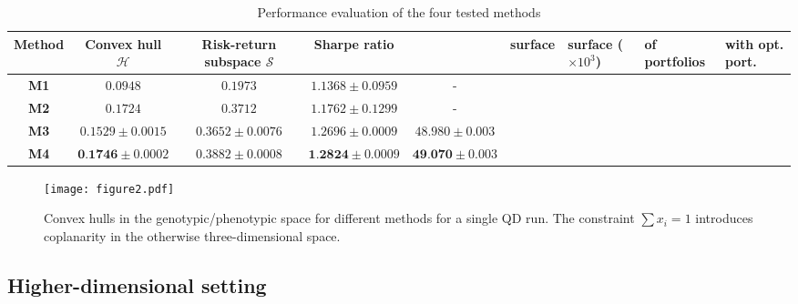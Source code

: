\begin{table}[ht!]
\centering
\caption{Performance evaluation of the four tested methods}
\begin{tabular}{|c|c|c|c|c|}
\hline
Method & Convex hull $\mathcal{H}$& Risk-return subspace $\mathcal{S}$ & Sharpe ratio & \ & surface & surface ($\times 10^{3}$) & of portfolios & with opt. port. \\
\hline
\textbf{M1} & $0.0948$ & $0.1973$ & $1.1368 \pm 0.0959$ & - \\
\hline
\textbf{M2} & $0.1724$ & $0.3712$ & $1.1762 \pm 0.1299$ & - \\
\hline
\textbf{M3} & $0.1529 \pm 0.0015 $ & $0.3652 \pm 0.0076$ & $1.2696 \pm 0.0009$ & $48.980 \pm 0.003 $ \\
\hline
\textbf{M4} & $\textbf{0.1746} \pm 0.0002$ & $0.3882 \pm 0.0008 $ & $\textbf{1.2824} \pm 0.0009$ & $\textbf{49.070} \pm 0.003$ \\
\hline
\end{tabular}
\label{table2}
\end{table}

\begin{figure}[ht!]
\texttt{[image: figure2.pdf]}
\centering
\caption{Convex hulls in the genotypic/phenotypic space for different methods for a single QD run. The constraint $\sum x_i = 1$ introduces coplanarity in the otherwise three-dimensional space.}
\label{figure2}
\end{figure}


\subsection{Higher-dimensional setting}

